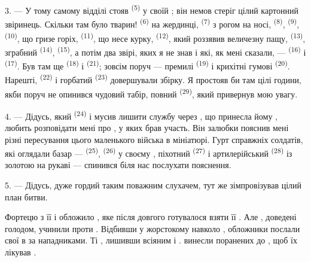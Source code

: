 3. --- У тому самому відділі стояв  \textsuperscript{(5)} у
своїй ; він немов стеріг цілий картонний звіринець. Скільки там
було тварин!  \textsuperscript{(6)} на жердинці,
 \textsuperscript{(7)} з рогом на носі, 
\textsuperscript{(8)},  \textsuperscript{(9)}, 
\textsuperscript{(10)}, що гризе горіх,  \textsuperscript{(11)}, що
несе курку,  \textsuperscript{(12)}, який роззявив величезну
пащу,  \textsuperscript{(13)}, зграбний 
\textsuperscript{(14)},  \textsuperscript{(15)}, а потім два
звірі, яких я не знав і які, як мені сказали, --- 
\textsuperscript{(16)} і  \textsuperscript{(17)}. Був там ще
 \textsuperscript{(18)} і  \textsuperscript{(21)};
зовсім поруч --- премилі  \textsuperscript{(19)} і крихітні гумові
 \textsuperscript{(20)}. Нарешті, 
\textsuperscript{(22)} і горбатий  \textsuperscript{(23)}
довершували збірку. Я простояв би там цілі години, якби поруч не опинився чудовий
табір, повний  \textsuperscript{(29)}, який
привернув мою увагу.

\VUsaut{4.0mm}
\VUsaut{2.8mm}

4. --- Дідусь, який  \textsuperscript{(24)} і мусив лишити службу
через , що принесла йому , любить
розповідати мені про , у яких брав участь. Він залюбки пояснив
мені різні пересування цього маленького війська в мініатюрі. Гурт справжніх
солдатів, які оглядали базар ---  \textsuperscript{(25)},
 \textsuperscript{(26)} у своєму ,
піхотний  \textsuperscript{(27)} і артилерійський
 \textsuperscript{(28)} із золотою  на рукаві ---
спинився біля нас послухати пояснення.

5. --- Дідусь, дуже гордий таким поважним слухачем, тут же зімпровізував цілий
план битви.

Фортецю з її  і  обложило , яке після довгого  готувалося взяти її
. Але , доведені голодом, учинили
 проти  . Відбивши
 у жорстокому  навколо ,
 обложники послали свої  в 
за  нападниками. Ті , лишивши
 всіяним  і .
 винесли поранених до , щоб їх
лікував .

